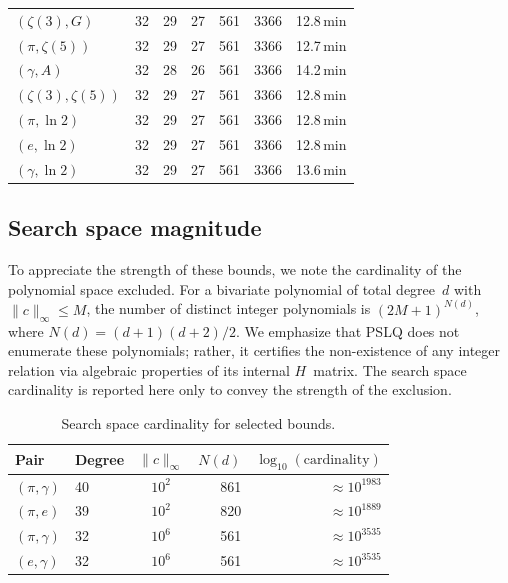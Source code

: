 \documentclass[11pt]{amsart}
\theoremstyle{remark}
\newcommand{\norm}[1]{\lVert #1 \rVert}
\begin{document}
\begin{table}[ht]
\begin{tabular}{@{}l rrr rr r@{}}
$(\zeta(3),G)$      & 32 & 29 & 27 & 561 & 3366 & 12.8\,min \\
$(\pi,\zeta(5))$    & 32 & 29 & 27 & 561 & 3366 & 12.7\,min \\
$(\gamma,A)$        & 32 & 28 & 26 & 561 & 3366 & 14.2\,min \\
$(\zeta(3),\zeta(5))$ & 32 & 29 & 27 & 561 & 3366 & 12.8\,min \\
$(\pi,\ln 2)$       & 32 & 29 & 27 & 561 & 3366 & 12.8\,min \\
$(e,\ln 2)$         & 32 & 29 & 27 & 561 & 3366 & 12.8\,min \\
$(\gamma,\ln 2)$    & 32 & 29 & 27 & 561 & 3366 & 13.6\,min \\
\bottomrule
\end{tabular}
\end{table}

\subsection{Search space magnitude}\label{ssec:searchspace}

To appreciate the strength of these bounds, we note the cardinality of the polynomial
space excluded. For a bivariate polynomial of total degree~$d$ with
$\norm{c}_\infty\le M$, the number of distinct integer polynomials is
$(2M+1)^{N(d)}$, where $N(d)=(d+1)(d+2)/2$. We emphasize that PSLQ does not
enumerate these polynomials; rather, it certifies the non-existence of any integer
relation via algebraic properties of its internal $H$~matrix. The search space
cardinality is reported here only to convey the strength of the exclusion.

\begin{table}[ht]
\centering
\caption{Search space cardinality for selected bounds.}\label{tab:searchspace}
\begin{tabular}{@{}llcrr@{}}
\toprule
Pair & Degree & $\norm{c}_\infty$ & $N(d)$ & $\log_{10}(\text{cardinality})$ \\
\midrule
$(\pi,\gamma)$ & 40 & $10^2$ & 861 & $\approx 10^{1983}$ \\
$(\pi,e)$      & 39 & $10^2$ & 820 & $\approx 10^{1889}$ \\
$(\pi,\gamma)$ & 32 & $10^6$ & 561 & $\approx 10^{3535}$ \\
$(e,\gamma)$   & 32 & $10^6$ & 561 & $\approx 10^{3535}$ \\
\bottomrule
\end{tabular}
\end{table}
\end{document}
